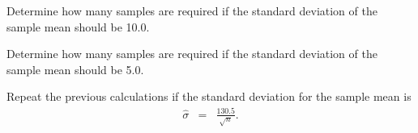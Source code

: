 \begin{problem}
  \begin{subproblem}
    \item Determine how many samples are required if the standard
      deviation of the sample mean should be 10.0.

      \vfill

    \item Determine how many samples are required if the standard
      deviation of the sample mean should be 5.0.

      \vfill

    \item Repeat the previous calculations if the standard deviation
      for the sample mean is
      \begin{eqnarray*}
        \hat{\sigma} & = & \frac{130.5}{\sqrt{n}}.
      \end{eqnarray*}

      \vfill


  \end{subproblem}

\end{problem}


